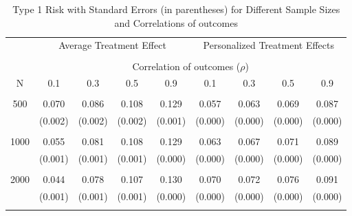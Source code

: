 \begin{table}[H]
\centering
\begin{tabular}{c||cccc|cccc}
\hline\hline
& \multicolumn{4}{c|}{Average Treatment Effect} & \multicolumn{4}{c}{Personalized Treatment Effects} \\
\cline{2-9}
\\
& \multicolumn{8}{c}{Correlation of outcomes ($\rho$)} \\
\cline{2-9}
N & 0.1 & 0.3 & 0.5 & 0.9 & 0.1 & 0.3 & 0.5 & 0.9 \\
\hline
\\
500 & 0.070 & 0.086 & 0.108 & 0.129 & 0.057 & 0.063 & 0.069 & 0.087 \\
& (0.002) & (0.002) & (0.002) & (0.001) & (0.000) & (0.000) & (0.000) & (0.000) \\
\\
1000 & 0.055 & 0.081 & 0.108 & 0.129 & 0.063 & 0.067 & 0.071 & 0.089 \\
& (0.001) & (0.001) & (0.001) & (0.000) & (0.000) & (0.000) & (0.000) & (0.000) \\
\\
2000 & 0.044 & 0.078 & 0.107 & 0.130 & 0.070 & 0.072 & 0.076 & 0.091 \\
& (0.001) & (0.001) & (0.001) & (0.000) & (0.000) & (0.000) & (0.000) & (0.000) \\
\\
\hline\hline
\end{tabular}
\caption{Type 1 Risk with Standard Errors (in parentheses) for Different Sample Sizes and Correlations of outcomes}
\label{tab:type1_risks}
\end{table}
